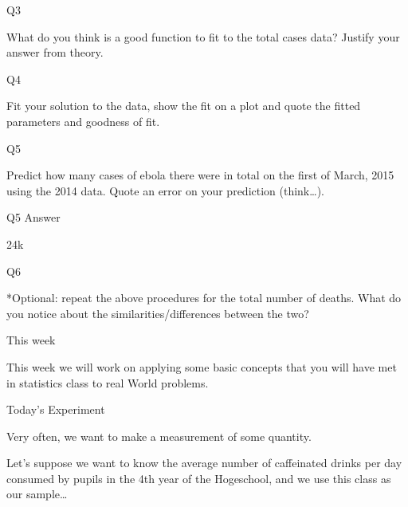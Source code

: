 \documentclass{beamer}
\begin{document}
\begin{frame}{Q3}

What do you think is a good function to fit to the total cases data?  Justify your answer from theory.

\end{frame}

\begin{frame}{Q4}

Fit your solution to the data, show the fit on a plot and quote the fitted parameters and goodness of fit.

\end{frame}

\begin{frame}{Q5}

Predict how many cases of ebola there were in total on the first of March, 2015 using the 2014 data.  Quote an error on your prediction (think\ldots).

\end{frame}

\begin{frame}{Q5 Answer}

24k

\end{frame}

\begin{frame}{Q6}

*Optional: repeat the above procedures for the total number of deaths.  What do you notice about the similarities/differences between the two?

\end{frame}


\begin{frame}{This week}

This week we will work on applying some basic concepts that you will have met in statistics class to real World problems.

\end{frame}


\begin{frame}{Today's Experiment}

Very often, we want to make a measurement of some quantity.  

\vspace{5mm}

Let's suppose we want to know the average number of caffeinated drinks per day consumed by pupils in the 4th year of the Hogeschool, and we use this class as our sample\ldots

\end{frame}
\end{document}
